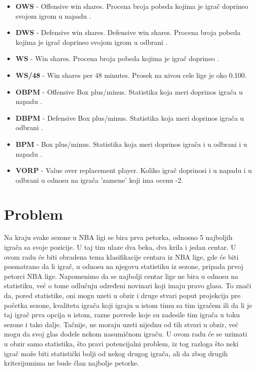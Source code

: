 \documentclass[a4paper]{article}
\begin{document}
\begin{itemize}
	\item \textbf{OWS} - Offensive win shares. Procena broja pobeda kojima je igrač doprineo svojom igrom u napadu \cite{ws}.
	\item \textbf{DWS} - Defensive win shares. Defensive win shares. Procena broja pobeda kojima je igrač doprineo svojom igrom u odbrani \cite{ws}.
	\item \textbf{WS} - Win shares. Procena broja pobeda kojima je igrač doprineo \cite{ws}.
	\item \textbf{WS/48} - Win shares per 48 minutes. Prosek na nivou cele lige je oko 0.100.
	\item \textbf{OBPM} - Offensive Box plus/minus. Statistika koja meri doprinos igrača u napadu \cite{bpm}.
	\item \textbf{DBPM} - Defensive Box plus/minus. Statistika koja meri doprinos igrača u odbrani \cite{bpm}.
	\item \textbf{BPM} - Box plus/minus. Statistika koja meri doprinos igrača i u odbrani i u napadu \cite{bpm}.
	\item \textbf{VORP} - Value over replacement player. Koliko igrač doprinosi i u napadu i u odbrani u odnosu na igrača ’zamene’ koji ima ocenu -2. \cite{bpm}
\end{itemize}

\section{Problem}
\label{sec:problem}

	Na kraju svake sezone u NBA ligi se bira prva petorka, odnosno 5 najboljih
igrača sa svoje pozicije. U taj tim ulaze dva beka, dva krila i jedan centar. U
ovom radu će biti obradena tema klasifikacije centara iz NBA lige, gde će biti
posmatrano da li igrač, u odnosu na njegovu statistiku iz sezone, pripada prvoj
petorci NBA lige. Napomenimo da se najbolji centar lige ne bira u odnosu na
statistiku, već o tome odlučuju određeni novinari koji imaju pravo glasa. To znači da, pored statistike, oni mogu uzeti u obzir i druge stvari poput projekcija
pre početka sezone, kvaliteta igrača koji igraju u istom timu sa tim igračem ili da li je taj igrač prva opcija u istom, razne povrede koje su zadesile tim igrača u toku sezone i tako dalje. Tačnije, ne moraju uzeti nijednu od tih stvari u obzir, već mogu da svoj glas dodele nekom nasumičnom igraču. U ovom radu će se uzimati u obzir samo statistika, što pravi potencijalni problem, iz tog razloga što neki igrač može biti statistički bolji od nekog drugog igrača, ali da zbog drugih kriterijumima ne bude član najbolje petorke.
\end{document}

